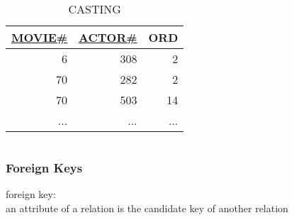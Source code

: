 \documentclass[dvipsnames]{beamer}
\theoremstyle{plain}
\begin{document}
\begin{frame}
\begin{example}
\begin{columns}[t]
      \begin{tiny}
      \begin{table}
        \caption{CASTING}
        \begin{tabular}{|r|r|r|}\hline
\underline{MOVIE\#} & \underline{ACTOR\#} & ORD\\[2pt]\hline\hline
                  6 &                 308 &   2\\\hline
                 70 &                 282 &   2\\\hline
                 70 &                 503 &  14\\\hline
                ... &                 ... & ...\\\hline
        \end{tabular}
      \end{table}
      \end{tiny}
    \end{columns}
  \end{example}
\end{frame}

\begin{frame}
  \frametitle{Foreign Keys}

  \begin{definition}
    \alert{foreign key}:\\
      an attribute of a relation is the candidate key of another relation
  \end{definition}
\end{frame}
\end{document}
